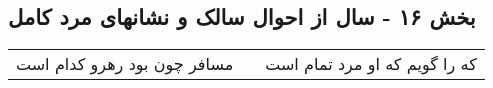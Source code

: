 \begin{center}
\section*{بخش ۱۶ - سال از احوال سالک و نشانهای مرد کامل}
\label{sec:sh016}
\begin{longtable}{l p{0.5cm} r}
مسافر چون بود رهرو کدام است
&&
که را گویم که او مرد تمام است
\\
\end{longtable}
\end{center}
